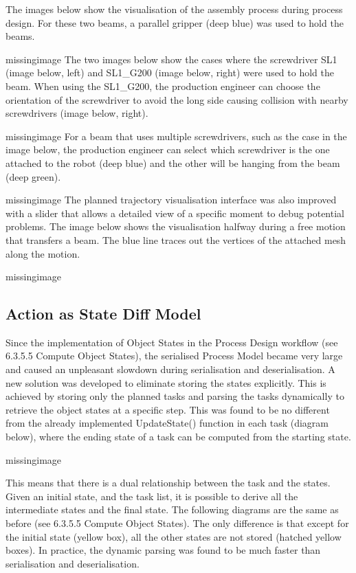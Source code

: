 The images below show the visualisation of the assembly process during process design. For these two beams, a parallel gripper (deep blue) was used to hold the beams.

missingimage
The two images below show the cases where the screwdriver SL1 (image below, left) and SL1\_G200 (image below, right) were used to hold the beam. When using the SL1\_G200, the production engineer can choose the orientation of the screwdriver to avoid the long side causing collision with nearby screwdrivers (image below, right). 

missingimage
For a beam that uses multiple screwdrivers, such as the case in the image below, the production engineer can select which screwdriver is the one attached to the robot (deep blue) and the other will be hanging from the beam (deep green).

missingimage
The planned trajectory visualisation interface was also improved with a slider that allows a detailed view of a specific moment to debug potential problems. The image below shows the visualisation halfway during a free motion that transfers a beam. The blue line traces out the vertices of the attached mesh along the motion.

missingimage

\subsection{Action as State Diff Model} 
Since the implementation of Object States in the Process Design workflow (see 6.3.5.5 Compute Object States), the serialised Process Model became very large and caused an unpleasant slowdown during serialisation and deserialisation. A new solution was developed to eliminate storing the states explicitly. 
This is achieved by storing only the planned tasks and parsing the tasks dynamically to retrieve the object states at a specific step. This was found to be no different from the already implemented UpdateState() function in each task (diagram below), where the ending state of a task can be computed from the starting state. 

missingimage

This means that there is a dual relationship between the task and the states. Given an initial state, and the task list, it is possible to derive all the intermediate states and the final state. The following diagrams are the same as before (see 6.3.5.5 Compute Object States). The only difference is that except for the initial state (yellow box), all the other states are not stored (hatched yellow boxes). In practice, the dynamic parsing was found to be much faster than serialisation and deserialisation.

